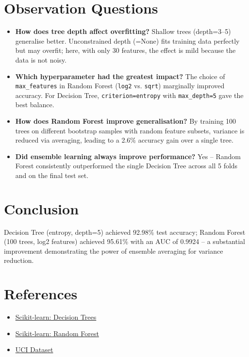 \documentclass[11pt]{article}
\begin{document}
\section*{Observation Questions}
\begin{itemize}
    \item \textbf{How does tree depth affect overfitting?} Shallow trees (depth=3--5) generalise better. Unconstrained depth (=None) fits training data perfectly but may overfit; here, with only 30 features, the effect is mild because the data is not noisy.
    \item \textbf{Which hyperparameter had the greatest impact?} The choice of \texttt{max\_features} in Random Forest (\texttt{log2} vs. \texttt{sqrt}) marginally improved accuracy. For Decision Tree, \texttt{criterion=entropy} with \texttt{max\_depth=5} gave the best balance.
    \item \textbf{How does Random Forest improve generalisation?} By training 100 trees on different bootstrap samples with random feature subsets, variance is reduced via averaging, leading to a 2.6\% accuracy gain over a single tree.
    \item \textbf{Did ensemble learning always improve performance?} Yes -- Random Forest consistently outperformed the single Decision Tree across all 5 folds and on the final test set.
\end{itemize}

\section*{Conclusion}
Decision Tree (entropy, depth=5) achieved 92.98\% test accuracy; Random Forest (100 trees, log2 features) achieved 95.61\% with an AUC of 0.9924 -- a substantial improvement demonstrating the power of ensemble averaging for variance reduction.

\section*{References}
\begin{itemize}
    \item \href{https://scikit-learn.org/stable/modules/tree.html}{Scikit-learn: Decision Trees}
    \item \href{https://scikit-learn.org/stable/modules/ensemble.html}{Scikit-learn: Random Forest}
    \item \href{https://archive.ics.uci.edu/dataset/17/breast+cancer+wisconsin+diagnostic}{UCI Dataset}
\end{itemize}
\end{document}
